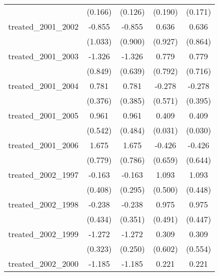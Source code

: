 {\begin{tabular}{l*{4}{c}}
            &     (0.166)         &     (0.126)         &     (0.190)         &     (0.171)         \\
[1em]
treated\_2001\_2002&      -0.855         &      -0.855         &       0.636         &       0.636         \\
            &     (1.033)         &     (0.900)         &     (0.927)         &     (0.864)         \\
[1em]
treated\_2001\_2003&      -1.326         &      -1.326\sym{*}  &       0.779         &       0.779         \\
            &     (0.849)         &     (0.639)         &     (0.792)         &     (0.716)         \\
[1em]
treated\_2001\_2004&       0.781\sym{*}  &       0.781\sym{*}  &      -0.278         &      -0.278         \\
            &     (0.376)         &     (0.385)         &     (0.571)         &     (0.395)         \\
[1em]
treated\_2001\_2005&       0.961         &       0.961\sym{*}  &       0.409\sym{***}&       0.409\sym{***}\\
            &     (0.542)         &     (0.484)         &     (0.031)         &     (0.030)         \\
[1em]
treated\_2001\_2006&       1.675\sym{*}  &       1.675\sym{*}  &      -0.426         &      -0.426         \\
            &     (0.779)         &     (0.786)         &     (0.659)         &     (0.644)         \\
[1em]
treated\_2002\_1997&      -0.163         &      -0.163         &       1.093\sym{*}  &       1.093\sym{*}  \\
            &     (0.408)         &     (0.295)         &     (0.500)         &     (0.448)         \\
[1em]
treated\_2002\_1998&      -0.238         &      -0.238         &       0.975\sym{*}  &       0.975\sym{*}  \\
            &     (0.434)         &     (0.351)         &     (0.491)         &     (0.447)         \\
[1em]
treated\_2002\_1999&      -1.272\sym{***}&      -1.272\sym{***}&       0.309         &       0.309         \\
            &     (0.323)         &     (0.250)         &     (0.602)         &     (0.554)         \\
[1em]
treated\_2002\_2000&      -1.185\sym{***}&      -1.185\sym{***}&       0.221         &       0.221         \\

\end{tabular}}
